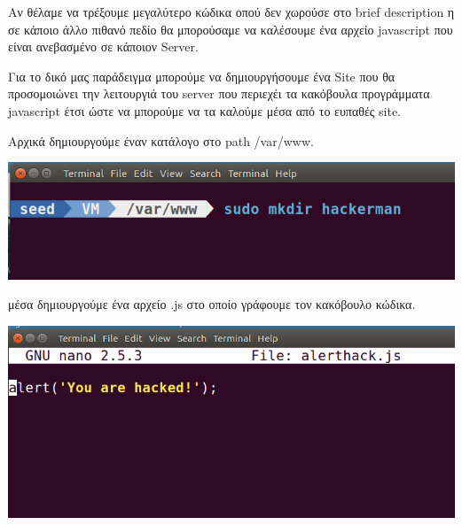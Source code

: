 \noindent
Αν θέλαμε να τρέξουμε μεγαλύτερο κώδικα οπού δεν χωρούσε 
στο brief description η σε κάποιο άλλο πιθανό πεδίο θα μπορούσαμε
να καλέσουμε ένα αρχείο javascript που είναι ανεβασμένο σε κάποιον
Server.

\noindent
Για το δικό μας παράδειγμα μπορούμε να δημιουργήσουμε ένα Site
που θα προσομοιώνει την λειτουργιά του server που περιεχέι τα
κακόβουλα προγράμματα javascript έτσι ώστε να μπορούμε να τα
καλούμε μέσα από το ευπαθές site.

\noindent
Αρχικά δημιουργούμε έναν κατάλογο στο path /var/www.

\begin{center}
			\includegraphics[width=1\textwidth]{image/1.5.1.PNG}		
\end{center}

\noindent
μέσα δημιουργούμε ένα αρχείο .js στο οποίο γράφουμε τον κακόβουλο
κώδικα.

\begin{center}
			\includegraphics[width=1\textwidth]{image/1.5.2.PNG}		
\end{center}

